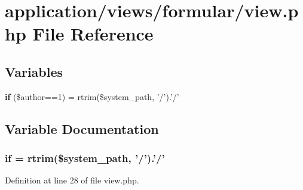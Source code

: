 \section{application/views/formular/view.php File Reference}
\label{view_8php}
\subsection*{Variables}
\begin{DoxyCompactItemize}
\item 
{\bf if} (\$author==1) = rtrim(\$system\-\_\-path, '/').'/'
\end{DoxyCompactItemize}


\subsection{Variable Documentation}
\subsubsection[{if}]{\setlength{\rightskip}{0pt plus 5cm}if = rtrim(\$system\-\_\-path, '/').'/'}\label{view_8php_aedd748201fa69e4a7b1166124a4a76b7}


Definition at line 28 of file view.\-php.


